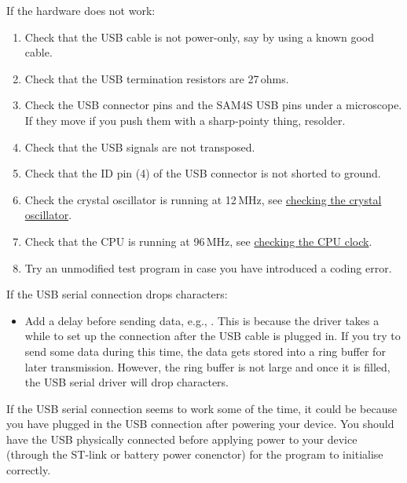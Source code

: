 If the hardware does not work:
%
\begin{enumerate}
  \item Check that the USB cable is not power-only, say by using a
    known good cable.

  \item
    Check that the USB termination resistors are 27\,ohms.

  \item Check the USB connector pins and the SAM4S USB pins under a
    microscope.  If they move if you push them with a sharp-pointy
    thing, resolder.

  \item
    Check that the USB signals are not transposed.

  \item Check that the ID pin (4) of the USB connector is not shorted
    to ground.

  \item Check the crystal oscillator is running at 12\,MHz, see
    \protect\hyperref[checking-the-crystal-oscillator]{checking the
      crystal oscillator}.

  \item Check that the CPU is running at 96\,MHz, see
    \protect\hyperref[checking-the-clock]{checking the CPU clock}.

  \item Try an unmodified test program in case you have introduced a
    coding error.
\end{enumerate}

If the USB serial connection drops characters:
 \begin{itemize}
 \item Add a delay before sending data, e.g., .
   This is because the driver takes a while to set up the connection
   after the USB cable is plugged in.  If you try to send some data
   during this time, the data gets stored into a ring buffer for later
   transmission.  However, the ring buffer is not large and once it is
   filled, the USB serial driver will drop characters.
 \end{itemize}

If the USB serial connection seems to work some of the time, it could
be because you have plugged in the USB connection after powering
your device. You should have the USB physically connected before
applying power to your device (through the ST-link or battery power
conenctor) for the program to initialise correctly.

